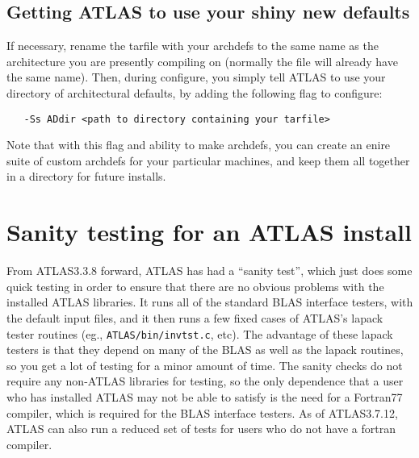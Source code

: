 \documentclass[11pt]{article}
\newcommand{\Wskip}[1]{ }
\begin{document}
\subsection{Getting ATLAS to use your shiny new defaults}
If necessary, rename the tarfile with your archdefs to the same name
as the architecture you are presently compiling on (normally the file will
already have the same name).  Then, during configure, you simply tell
ATLAS to use your directory of architectural defaults, by adding
the following flag to configure:
\begin{verbatim}
   -Ss ADdir <path to directory containing your tarfile>
\end{verbatim}

Note that with this flag and ability to make archdefs, you can create an
enire suite of custom archdefs for your particular machines, and keep
them all together in a directory for future installs.
\Wskip{
Pretty easy:  
\begin{enumerate}
\item Run configure, creating {\tt Make.inc}, but do not start the install.
\item Take the tarfile you created, and copy it under
   {\tt ATLAS/CONFIG/ARCHS} source directory.  
\item Edit your {\tt Make.inc} and make sure the {\tt ARCH} macro matches
      the base name of your tarfile (eg., P4ESSE3), and that the INSTFLAGS
      macro has the flags {\tt -a 1} (do use arch defs).
\item Continue the install as normal (eg. {\tt make build}).
\end{enumerate}
}

\section{Sanity testing for an ATLAS install}
From ATLAS3.3.8 forward, ATLAS has had a ``sanity test'', which just does
some quick testing in order to ensure that there are no obvious problems
with the installed ATLAS libraries.  It runs all of the standard BLAS interface
testers, with the default input files, and it then runs a few fixed cases
of ATLAS's lapack tester routines (eg., {\tt ATLAS/bin/invtst.c}, etc).  The
advantage of these lapack testers is that they depend on many of
the BLAS as well as the lapack routines, so you get a lot of testing for
a minor amount of time.  The sanity checks do not require any non-ATLAS
libraries for testing, so the only dependence that a user who has installed
ATLAS may not be able to satisfy is the need for a Fortran77
compiler, which is required for the BLAS interface testers.
As of ATLAS3.7.12, ATLAS can also run a reduced set of tests for users
who do not have a fortran compiler.
\end{document}
